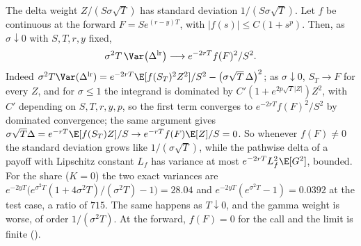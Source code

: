 \begin{remark}\label{rem:gr-lr-degenerate}
The delta weight $Z/(S\sigma\sqrt T)$ has standard deviation $1/(S\sigma\sqrt T)$. Let $f$ be
continuous at the forward $F=Se^{(r-y)T}$, with $|f(s)|\le C(1+s^p)$. Then, as $\sigma\downarrow0$
with $S,T,r,y$ fixed,
\[
  \sigma^2T\,\Var\big(\Delta^{\mathrm{lr}}\big)\longrightarrow e^{-2rT}f(F)^2/S^2 .
\]
Indeed $\sigma^2T\Var(\Delta^{\mathrm{lr}})=e^{-2rT}\E[f(S_T)^2Z^2]/S^2-\big(\sigma\sqrt T\,\Delta\big)^2$;
as $\sigma\downarrow0$, $S_T\to F$ for every $Z$, and for $\sigma\le1$ the integrand is
dominated by $C'(1+e^{2p\sqrt T|Z|})Z^2$, with $C'$ depending on $S,T,r,y,p$, so the first term converges to
$e^{-2rT}f(F)^2/S^2$ by dominated convergence; the same argument gives
$\sigma\sqrt T\Delta=e^{-rT}\E[f(S_T)Z]/S\to e^{-rT}f(F)\E[Z]/S=0$. So whenever $f(F)\ne0$ the
standard deviation grows like $1/(\sigma\sqrt T)$, while the pathwise delta of a payoff with
Lipschitz constant $L_f$ has variance at most $e^{-2rT}L_f^2\E[G^2]$, bounded. For the share
($K=0$) the two exact variances are $e^{-2yT}\big(e^{\sigma^2T}(1+4\sigma^2T)/(\sigma^2T)-1\big)=28.04$
and $e^{-2yT}(e^{\sigma^2T}-1)=0.0392$ at the test case, a ratio of $715$. The same happens as
$T\downarrow0$, and the gamma weight is worse, of order $1/(\sigma^2T)$. At the forward,
$f(F)=0$ for the call and the limit is finite ().
\end{remark}

